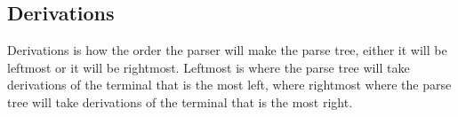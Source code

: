 \subsection{Derivations}
Derivations is how the order the parser will make the parse tree, either it will be leftmost or it will be rightmost. Leftmost is where the parse tree will take derivations of the terminal that is the most left, where rightmost where the parse tree will take derivations of the terminal that is the most right.